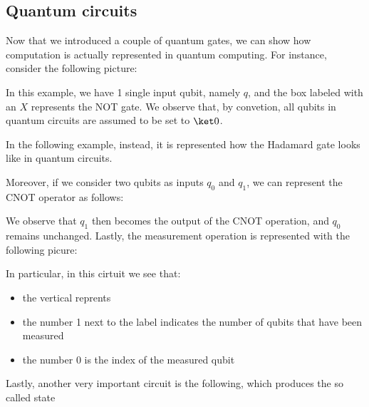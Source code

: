 \documentclass[a4paper, 12pt]{report}
\begin{document}
\subsection{Quantum circuits}

Now that we introduced a couple of quantum gates, we can show how computation is actually represented in quantum computing. For instance, consider the following picture:


In this example, we have 1 single input qubit, namely $q$, and the box labeled with an $X$ represents the NOT gate. We observe that, by convetion, all qubits in quantum circuits are assumed to be set to $\ket 0$.

In the following example, instead, it is represented how the Hadamard gate looks like in quantum circuits.


Moreover, if we consider two qubits as inputs $q_0$ and $q_1$, we can represent the CNOT operator as follows:


We observe that $q_1$ then becomes the output of the CNOT operation, and $q_0$ remains unchanged. Lastly, the measurement operation is represented with the following picure:


In particular, in this cirtuit we see that:

\begin{itemize}
	\item the vertical  reprents 
	\item the number 1 next to the label  indicates the number of qubits that have been measured
	\item the number 0 is the index of the measured qubit
\end{itemize}


Lastly, another very important circuit is the following, which produces the so called  state

\end{document}
